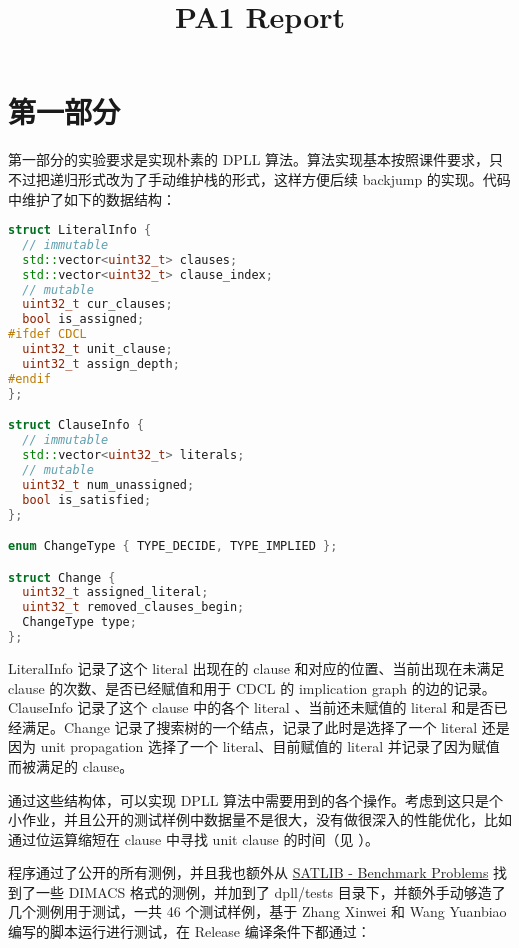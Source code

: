 \documentclass[11pt,a4paper]{ctexart}
\title{PA1 Report}
\begin{document}
\maketitle


\section{第一部分}

第一部分的实验要求是实现朴素的 DPLL 算法。算法实现基本按照课件要求，只不过把递归形式改为了手动维护栈的形式，这样方便后续 backjump 的实现。代码中维护了如下的数据结构：

\begin{lstlisting}[language=c++]
struct LiteralInfo {
  // immutable
  std::vector<uint32_t> clauses;
  std::vector<uint32_t> clause_index;
  // mutable
  uint32_t cur_clauses;
  bool is_assigned;
#ifdef CDCL
  uint32_t unit_clause;
  uint32_t assign_depth;
#endif
};

struct ClauseInfo {
  // immutable
  std::vector<uint32_t> literals;
  // mutable
  uint32_t num_unassigned;
  bool is_satisfied;
};

enum ChangeType { TYPE_DECIDE, TYPE_IMPLIED };

struct Change {
  uint32_t assigned_literal;
  uint32_t removed_clauses_begin;
  ChangeType type;
};
\end{lstlisting}

LiteralInfo 记录了这个 literal 出现在的 clause 和对应的位置、当前出现在未满足 clause 的次数、是否已经赋值和用于 CDCL 的 implication graph 的边的记录。ClauseInfo 记录了这个 clause 中的各个 literal 、当前还未赋值的 literal 和是否已经满足。Change 记录了搜索树的一个结点，记录了此时是选择了一个 literal 还是因为 unit propagation 选择了一个 literal、目前赋值的 literal 并记录了因为赋值而被满足的 clause。

通过这些结构体，可以实现 DPLL 算法中需要用到的各个操作。考虑到这只是个小作业，并且公开的测试样例中数据量不是很大，没有做很深入的性能优化，比如通过位运算缩短在 clause 中寻找 unit clause 的时间（见 \cite{ahmed_implementation_nodate} ）。

程序通过了公开的所有测例，并且我也额外从 \href{https://www.cs.ubc.ca/~hoos/SATLIB/benchm.html}{SATLIB - Benchmark Problems} 找到了一些 DIMACS 格式的测例，并加到了 dpll/tests 目录下，并额外手动够造了几个测例用于测试，一共 46 个测试样例，基于 Zhang Xinwei 和 Wang Yuanbiao 编写的脚本运行进行测试，在 Release 编译条件下都通过：
\end{document}

